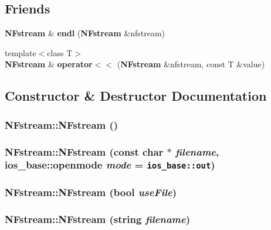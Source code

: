 \subsection*{Friends}
\begin{CompactItemize}
\item 
{\bf NFstream} \& {\bf endl} ({\bf NFstream} \&nfstream)
\item 
{\footnotesize template$<$class T$>$ }\\{\bf NFstream} \& {\bf operator$<$$<$} ({\bf NFstream} \&nfstream, const T \&value)
\end{CompactItemize}


\subsection{Constructor \& Destructor Documentation}
\subsubsection{\setlength{\rightskip}{0pt plus 5cm}NFstream::NFstream ()}\label{classNFstream_1b5a7c78a012438667ce9b4fc1d9fa84}


\subsubsection{\setlength{\rightskip}{0pt plus 5cm}NFstream::NFstream (const char $\ast$ {\em filename}, ios\_\-base::openmode {\em mode} = {\tt ios\_\-base::out})}\label{classNFstream_ddf778a9a709d0dc010292d1b1c6d3d1}


\subsubsection{\setlength{\rightskip}{0pt plus 5cm}NFstream::NFstream (bool {\em useFile})}\label{classNFstream_adfbd255c9c1cdf5e13d2228995fdc1b}


\subsubsection{\setlength{\rightskip}{0pt plus 5cm}NFstream::NFstream (string {\em filename})}\label{classNFstream_f9d9bc2da094f4a70aa49d5007d44447}


